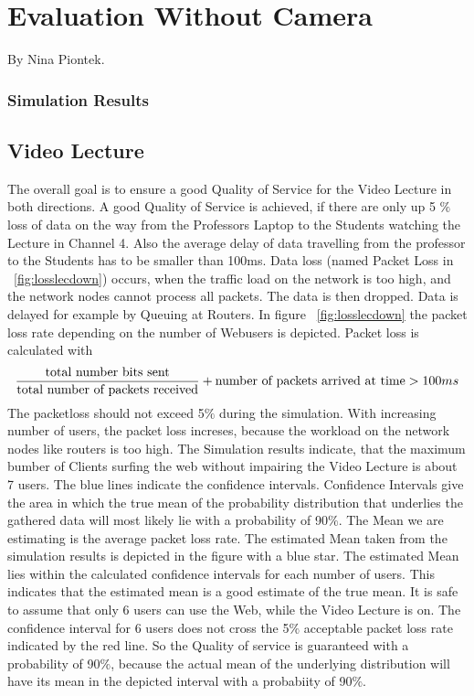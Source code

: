 \documentclass[a4paper,10pt]{book}\usepackage{graphicx}
\begin{document}
\chapter{Evaluation Without Camera}
By Nina Piontek.\\

\subsection{Simulation Results}
\section{Video Lecture}
The overall goal is to ensure a good Quality of Service for the Video Lecture in both directions.
A good Quality of Service is achieved, if there are only up 5 $\%$ loss of data
on the way from the Professors Laptop to the Students watching the Lecture in Channel 4. Also the average delay of data travelling from the professor to the Students has to be smaller than 100ms.
Data loss (named Packet Loss in ~\ref{fig:losslecdown}) occurs, when the traffic load on the network is too high, and the network nodes cannot process all packets.
The data is then dropped. Data is delayed for example by Queuing at Routers.
In figure  ~\ref{fig:losslecdown} the packet loss rate depending on the number of
Webusers is depicted. Packet loss is calculated with
\begin{equation}
 \frac{\textnormal{total number bits sent}}{\textnormal{total number of packets received}} + \textnormal{number of packets arrived at time} > 100ms
\end{equation}
The packetloss should not exceed 5$\%$ during the simulation.
With increasing number of users, the packet loss increses, because the 
workload on the network nodes like routers is too high.
The Simulation results indicate, that the maximum bumber of Clients surfing the 
web without impairing the Video Lecture is about 7 users.
The blue lines indicate the confidence intervals. Confidence Intervals give the area in which 
the true mean of the probability distribution that underlies the gathered data will most likely lie with a probability of 90$\%$.
The Mean we are estimating is the average packet loss rate. The estimated Mean taken from the simulation results is depicted in the figure with a blue star.
The estimated Mean lies within the calculated confidence intervals for each number of users. This indicates that the estimated mean is a good estimate of the true mean.
It is safe to assume that only 6 users can use the Web, while the Video Lecture is on.
The confidence interval for 6 users does not cross the 5$\%$ acceptable packet loss 
rate indicated by the red line. So the Quality of service is guaranteed with a probability of 90$\%$, because the actual mean of the
underlying distribution will have its mean in the depicted interval with a probabiity of 90$\%$.
\end{document}

